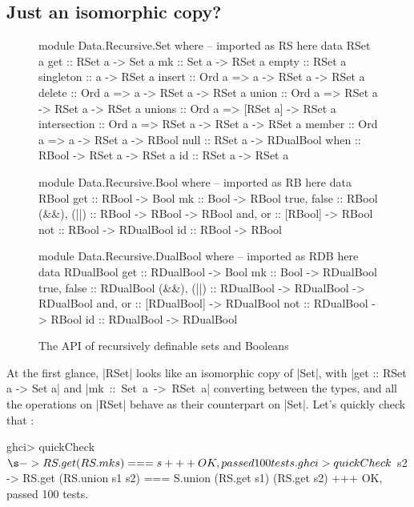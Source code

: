 \documentclass[manuscript,screen,acmsmall,nonacm]{acmart}
\begin{document}
\subsection{Just an isomorphic copy?}

\afterpage{\clearpage}
\begin{figure}[p]
\begin{code}
module Data.Recursive.Set where       -- imported as RS here
  data RSet a
  get           ::           RSet a ->            Set a
  mk            ::           Set a ->             RSet a
  empty         ::                                RSet a
  singleton     ::           a ->                 RSet a
  insert        :: Ord a =>  a -> RSet a ->       RSet a
  delete        :: Ord a =>  a -> RSet a ->       RSet a
  union         :: Ord a =>  RSet a -> RSet a ->  RSet a
  unions        :: Ord a =>  [RSet a] ->          RSet a
  intersection  :: Ord a =>  RSet a -> RSet a ->  RSet a
  member        :: Ord a =>  a -> RSet a ->       RBool
  null          ::           RSet a ->            RDualBool
  when          ::           RBool -> RSet a ->   RSet a
  id            ::           RSet a ->            RSet a

module Data.Recursive.Bool where      -- imported as RB here
  data RBool
  get          :: RBool ->           Bool
  mk           :: Bool ->            RBool
  true, false  ::                    RBool
  (&&), (||)   :: RBool -> RBool ->  RBool
  and, or      :: [RBool] ->         RBool
  not          :: RBool ->           RDualBool
  id           :: RBool ->           RBool

module Data.Recursive.DualBool where  -- imported as RDB here
  data RDualBool
  get          ::  RDualBool ->               Bool
  mk           ::  Bool ->                    RDualBool
  true, false  ::                             RDualBool
  (&&), (||)   ::  RDualBool -> RDualBool ->  RDualBool
  and, or      ::  [RDualBool] ->             RDualBool
  not          ::  RDualBool ->               RBool
  id           ::  RDualBool ->               RDualBool
\end{code}
\caption{The API of recursively definable sets and Booleans}\label{fig:api}
\end{figure}

At the first glance, |RSet| looks like an isomorphic copy of |Set|, with |get :: RSet a -> Set a| and \mbox{|mk :: Set a -> RSet a|} converting between the types, and all the operations on |RSet| behave as their counterpart on |Set|. Let's quickly check that \citep{quickcheck}:
\begin{code}
ghci> quickCheck $ \s -> RS.get (RS.mk s) === s
+++ OK, passed 100 tests.
ghci> quickCheck $  s2 -> RS.get (RS.union s1 s2) === S.union (RS.get s1) (RS.get s2)
+++ OK, passed 100 tests.
\end{code}
\end{document}
